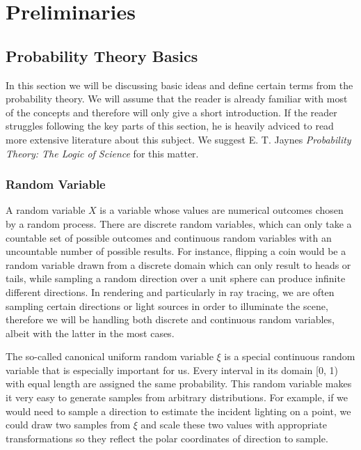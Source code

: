 
\chapter{Preliminaries}
\label{ch:preliminaries}

\section{Probability Theory Basics}
\label{ch:preliminaries:ptb}

In this section we will be discussing basic ideas and define certain terms from the probability theory. We will assume that the reader is already familiar with most of the concepts and therefore will only give a short introduction. If the reader struggles following the key parts of this section, he is heavily adviced to read more extensive literature about this subject. We suggest E. T. Jaynes \textit{Probability Theory: The Logic of Science} for this matter. \cite{PTTLS}

\subsection{Random Variable}

A random variable $X$ is a variable whose values are numerical outcomes chosen by a random process. There are discrete random variables, which can only take a countable set of possible outcomes and continuous random variables with an uncountable number of possible results. For instance, flipping a coin would be a random variable drawn from a discrete domain which can only result to heads or tails, while sampling a random direction over a unit sphere can produce infinite different directions. In rendering and particularly in ray tracing, we are often sampling certain directions or light sources in order to illuminate the scene, therefore we will be handling both discrete and continuous random variables, albeit with the latter in the most cases.

The so-called canonical uniform random variable $\xi$ is a special continuous random variable that is especially important for us. Every interval in its domain [0, 1) with equal length are assigned the same probability. This random variable makes it very easy to generate samples from arbitrary distributions. For example, if we would need to sample a direction to estimate the incident lighting on a point, we could draw two samples from $\xi$ and scale these two values with appropriate transformations so they reflect the polar coordinates of direction to sample.

